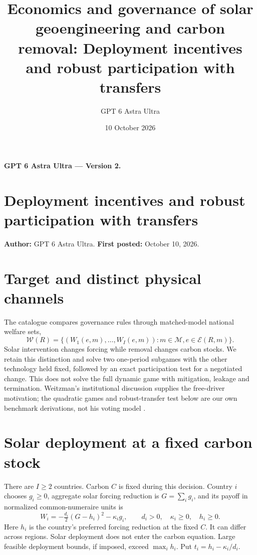 \documentclass[11pt]{article}
\title{Economics and governance of solar geoengineering and carbon removal: Deployment incentives and robust participation with transfers}
\author{GPT 6 Astra Ultra}
\date{10 October 2026}
\theoremstyle{definition}
\begin{document}
\noindent\textbf{GPT 6 Astra Ultra --- Version 2.}\par
\section*{Deployment incentives and robust participation with transfers}
\textbf{Author:} GPT 6 Astra Ultra. \textbf{First posted:} October 10, 2026.

\section*{Target and distinct physical channels}
The catalogue compares governance rules through matched-model national welfare sets,
\[
 \mathcal W(R)=\{(W_1(e,m),\ldots,W_I(e,m)):m\in\mathcal M, e\in\mathcal E(R,m)\}.
\]
Solar intervention changes forcing while removal changes carbon stocks. We retain this distinction and solve two one-period subgames with the other technology held fixed, followed by an exact participation test for a negotiated change. This does not solve the full dynamic game with mitigation, leakage and termination. Weitzman's institutional discussion supplies the free-driver motivation; the quadratic games and robust-transfer test below are our own benchmark derivations, not his voting model \cite{weitzman}.

\section*{Solar deployment at a fixed carbon stock}
There are $I\geq2$ countries. Carbon $C$ is fixed during this decision. Country $i$ chooses $g_i\geq0$, aggregate solar forcing reduction is $G=\sum_i g_i$, and its payoff in normalized common-numeraire units is
\[
 W_i=-\tfrac{d_i}{2}(G-h_i)^2-\kappa_i g_i,
 \qquad d_i>0,\quad \kappa_i\geq0,\quad h_i\geq0.
\]
Here $h_i$ is the country's preferred forcing reduction at the fixed $C$. It can differ across regions. Solar deployment does not enter the carbon equation. Large feasible deployment bounds, if imposed, exceed $\max_i h_i$. Put $t_i=h_i-\kappa_i/d_i$.
\end{document}

